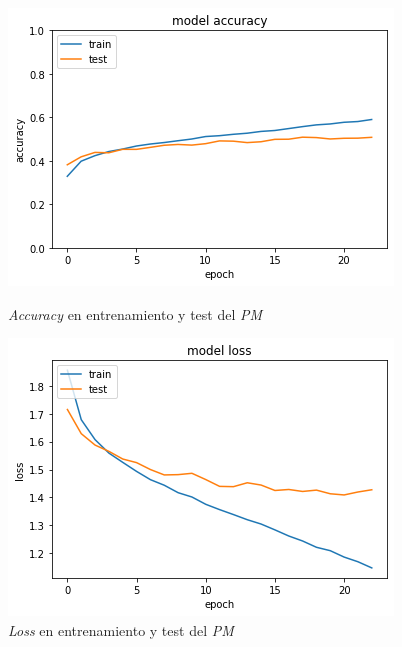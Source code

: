 \documentclass{uc3mpracticas}
\begin{document}
\begin{figure}[!h]
\centering
\begin{minipage}{.52\textwidth}
  \centering
  \includegraphics[width=.8\linewidth]{Images/accuracyPM.png}
  \caption*{\textit{Accuracy} en entrenamiento y test del \textit{PM}}
\end{minipage}%
\begin{minipage}{.52\textwidth}
  \centering
  \includegraphics[width=.8\linewidth]{Images/lossPM.png}
  \caption*{\textit{Loss} en entrenamiento y test del \textit{PM}}
\end{minipage}
\end{figure}
\end{document}

